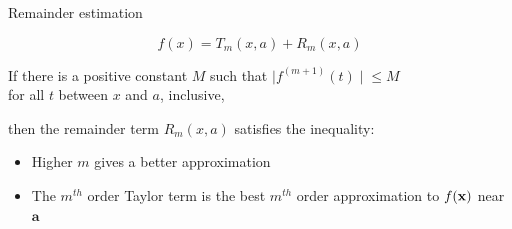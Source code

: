 \begin{vbframe}{Remainder estimation}

$$
  f(x) = T_m(x, a) + R_m(x, a)
$$
\vspace*{0.3cm}

If there is a positive constant $M$ such that $|f^{(m+1)}(t)∣ \leq M$\\
for all $t$ between $x$ and $a$, inclusive, 

\vspace*{0.3cm}

then the remainder term $R_m(x,a)$ satisfies the inequality:




  

\framebreak 

\begin{itemize}
  \item Higher $m$ gives a better approximation
  \item The $m^{th}$ order Taylor term is the best $m^{th}$ order approximation to $f(\mathbf{x})$ near $\bm{a}$
\end{itemize}



\end{vbframe}
